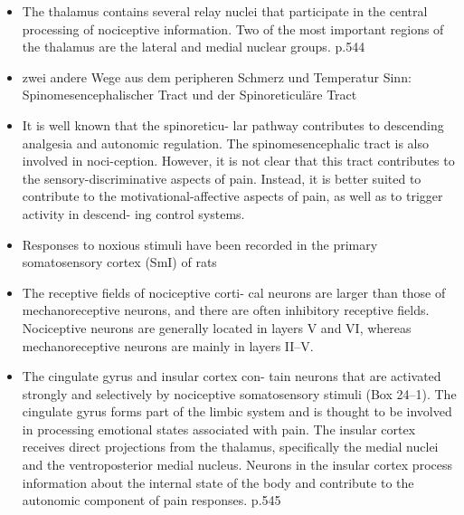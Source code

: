 \documentclass[12pt,a4paper,pdftex]{article}
\begin{document}
\begin{itemize}
\begin{itemize}
        \item The thalamus contains several relay nuclei that participate in the central processing of nociceptive information. Two of the most important regions of the thalamus are the lateral and medial nuclear groups. \cite{kandel2013principles} p.544
        \item zwei andere Wege aus dem peripheren Schmerz und Temperatur Sinn: Spinomesencephalischer Tract und der Spinoreticuläre Tract
        \item It is well known that the spinoreticu-
        lar pathway contributes to descending analgesia and
        autonomic regulation. The spinomesencephalic tract is also involved in noci-ception. However, it is not clear that this tract contributes
        to the sensory-discriminative aspects of pain. Instead, it
        is better suited to contribute to the motivational-affective
        aspects of pain, as well as to trigger activity in descend-
        ing control systems. \cite{paxinos2014rat}
        \item Responses to noxious stimuli have been recorded
        in the primary somatosensory cortex (SmI) of rats
        \cite{paxinos2014rat}
        \item The receptive fields of nociceptive corti-
        cal neurons are larger than those of mechanoreceptive
        neurons, and there are often inhibitory receptive fields.
        Nociceptive neurons are generally located in layers V and VI, whereas mechanoreceptive neurons are mainly
        in layers II–V. \cite{paxinos2014rat}
        \item The cingulate gyrus and insular cortex con-
        tain neurons that are activated strongly and selectively
        by nociceptive somatosensory stimuli (Box 24–1). The
        cingulate gyrus forms part of the limbic system and is
        thought to be involved in processing emotional states
        associated with pain. The insular cortex receives direct
        projections from the thalamus, specifically the medial nuclei and the ventroposterior medial nucleus. Neurons
        in the insular cortex process information about the
        internal state of the body and contribute to the autonomic component of pain responses. \cite{kandel2013principles} p.545
        
    \end{itemize}
\end{itemize}
\end{document}
